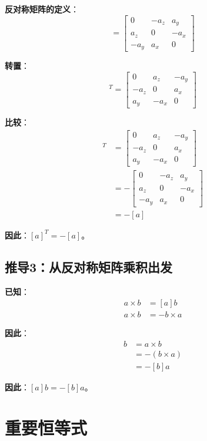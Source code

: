 \documentclass[12pt,a4paper]{article}
\begin{document}
\textbf{反对称矩阵的定义}：
\begin{equation}
[a] = \begin{bmatrix}
0 & -a_z & a_y \\
a_z & 0 & -a_x \\
-a_y & a_x & 0
\end{bmatrix}
\end{equation}

\textbf{转置}：
\begin{equation}
[a]^T = \begin{bmatrix}
0 & a_z & -a_y \\
-a_z & 0 & a_x \\
a_y & -a_x & 0
\end{bmatrix}
\end{equation}

\textbf{比较}：
\begin{align}
[a]^T &= \begin{bmatrix}
0 & a_z & -a_y \\
-a_z & 0 & a_x \\
a_y & -a_x & 0
\end{bmatrix} \\
&= -\begin{bmatrix}
0 & -a_z & a_y \\
a_z & 0 & -a_x \\
-a_y & a_x & 0
\end{bmatrix} \\
&= -[a]
\end{align}

\textbf{因此}：$[a]^T = -[a]$。

\subsection{推导3：从反对称矩阵乘积出发}

\textbf{已知}：
\begin{align}
a \times b &= [a] b \\
a \times b &= -b \times a
\end{align}

\textbf{因此}：
\begin{align}
[a] b &= a \times b \\
&= -(b \times a) \\
&= -[b] a
\end{align}

\textbf{因此}：$[a] b = -[b] a$。

\section{重要恒等式}
\end{document}
